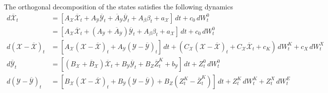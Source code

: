 \documentclass[10pt,a4paper]{amsart}
\numberwithin{equation}{section}
\begin{document}
The orthogonal decomposition of the states satisfies the following dynamics
\begin{align*}
    d\overline{\mathcal{X}}_t 
    &= [A_{\mathcal{X}} \overline{{\mathcal{X}}}_t + A_{\mathcal{Y}} \overline{\mathcal{Y}}_t + \overline{A}_{\mathcal{Y}} \overline{{\mathcal{Y}}}_t + A_\beta \beta_t + a_\mathcal{X}]\,dt + c_0\,dW_t^{0} \\
    &= [A_{\mathcal{X}} \overline{{\mathcal{X}}}_t + (A_{\mathcal{Y}} + \overline{A}_{\mathcal{Y}}) \overline{{\mathcal{Y}}}_t + A_\beta \beta_t + a_\mathcal{X}]\,dt + c_0\,dW_t^{0} \\
    d({\mathcal{X}} - \overline{{\mathcal{X}}})_t 
    &= [A_{\mathcal{X}}({\mathcal{X}} - \overline{{\mathcal{X}}})_t + A_{\mathcal{Y}}({\mathcal{Y}} - \overline{{\mathcal{Y}}})_t]\,dt + (C_{\mathcal{X}}({\mathcal{X}} - \overline{{\mathcal{X}}})_t + C_{\mathcal{X}} \overline{{\mathcal{X}}}_t +c_K )\,dW_t^{K} + c_X\,dW_t^{X} \\
    d\overline{\mathcal{Y}}_t 
    &= [(B_{\mathcal{X}} + \overline{B}_{\mathcal{X}}) \overline{\mathcal{X}}_t + B_{\mathcal{Y}} \overline{\mathcal{Y}}_t + B_Z \overline{Z}^K_t + b_\mathcal{Y}]\,dt + {Z}_t^{0}\,dW_t^{0} \\
    d({\mathcal{Y}} - \overline{{\mathcal{Y}}})_t 
    &= [B_{\mathcal{X}}({\mathcal{X}} - \overline{{\mathcal{X}}})_t + B_{\mathcal{Y}}({\mathcal{Y}} - \overline{{\mathcal{Y}}}) + B_Z({Z}^K_t - \overline{Z}^K_t)]\,dt + {Z}_t^{K}\,dW_t^{K} + {Z}_t^{X}\,dW^E_t
\end{align*}
\end{document}

